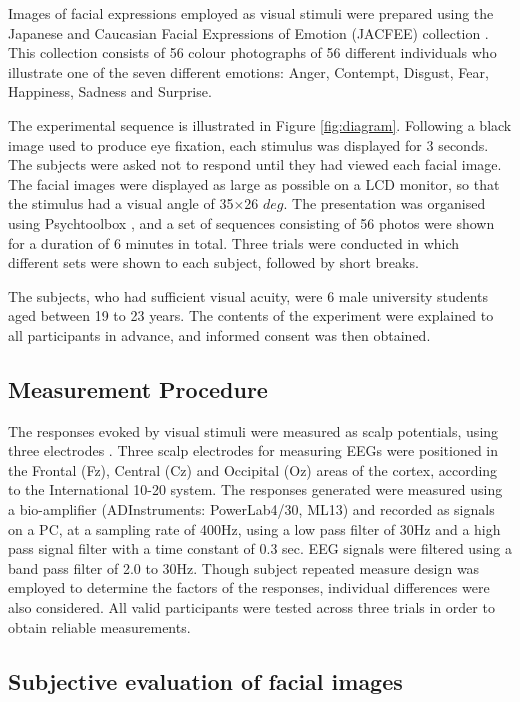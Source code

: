 \documentclass[fonts]{icst}
\begin{document}
Images of facial expressions employed as visual stimuli were prepared using
the Japanese and Caucasian Facial Expressions of Emotion (JACFEE)
collection \cite{jacfeeneuf}. 
This collection consists of 56 colour photographs of 56 different
individuals who illustrate one of the seven different emotions: Anger,
Contempt, Disgust, Fear, Happiness, Sadness and Surprise.

The experimental sequence is illustrated in Figure \ref{fig:diagram}. 
Following a black image used to produce eye fixation, each stimulus was
displayed for 3 seconds. 
The subjects were asked not to respond until they had viewed each facial
image.  
The facial images were displayed as large as possible on a LCD monitor,
so that the stimulus had a visual angle of 35$\times$26 $deg$.
The presentation was organised using Psychtoolbox \cite{psychotoolbox},    
and a set of sequences consisting of 56 photos were shown for a duration
of 6 minutes in total.  
Three trials were conducted in which different sets were shown to each
subject, followed by short breaks.  

The subjects, who had sufficient visual acuity, were 6 male university
students aged between 19 to 23 years.  
The contents of the experiment were explained to all participants in
advance, and informed consent was then obtained. 

\subsection{Measurement Procedure}

The responses evoked by visual stimuli were measured as scalp
potentials, using three electrodes \cite{minoru19}. 
Three scalp electrodes for measuring EEGs were positioned in the Frontal
(Fz), Central (Cz) and Occipital (Oz) areas of the cortex, according to
the International 10-20 system.  
The responses generated were measured using a bio-amplifier 
(ADInstruments: PowerLab4/30, ML13) and recorded as signals on a PC, 
at a sampling rate of 400Hz, using a low pass filter of 30Hz and a high pass
signal filter with a time constant of 0.3 sec. EEG signals were
filtered using a band pass filter of 2.0 to 30Hz. 
Though subject repeated measure design was employed to determine the factors
of the responses, individual differences were also considered. 
All valid participants were tested across three trials in order to
obtain reliable measurements. 

\subsection{Subjective evaluation of facial images}
\end{document}
